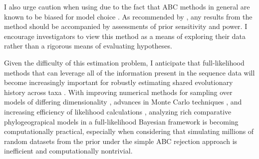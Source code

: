 I also urge caution when using \dppmsbayes due to the fact that ABC methods
in general are known to be biased for model choice \citep{Robert2011}.
As recommended by \citet{Oaks2012}, any results from the method should be
accompanied by assessments of prior sensitivity and power.
I encourage investigators to view this method as a means of exploring their
data rather than a rigorous means of evaluating hypotheses.

Given the difficulty of this estimation problem, I anticipate that
full-likelihood methods that can leverage all of the information present in the
sequence data will become increasingly important for robustly estimating shared
evolutionary history across taxa \citep{JeetDiss}.
With improving numerical methods for sampling over models of differing
dimensionality \citep{Green1995,Lemey2009}, advances in Monte Carlo techniques
\citep{Jordan2012}, and increasing efficiency of likelihood calculations
\citep{Ayres2012}, analyzing rich comparative phylogeograpical models in a
full-likelihood Bayesian framework is becoming computationally practical,
especially when considering that simulating millions of random datasets from
the prior under the simple ABC rejection approach is inefficient and
computationally nontrivial.

